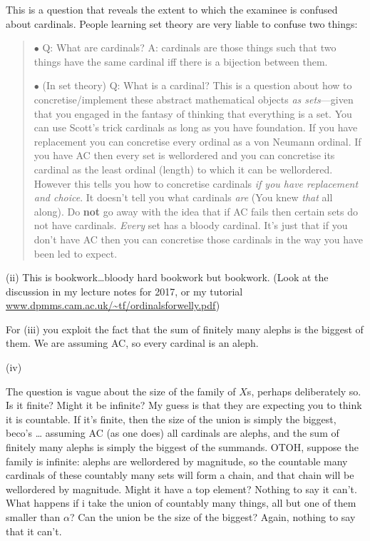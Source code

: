 \documentclass{book}
\begin{document}
This is a question that reveals the extent to which the examinee is
confused about cardinals.  People learning set theory are very liable
to confuse two things:
\begin{quote}
$\bullet$ Q: What are cardinals?  A: cardinals are those things such that
two things have the same cardinal iff there is a bijection between
them.

$\bullet$ (In set theory) Q: What is a cardinal?  This is a question
about how to concretise/implement these abstract mathematical objects
{\sl as sets}---given that you engaged in the fantasy of thinking that
everything is a set.  You can use Scott's trick cardinals as long as
you have foundation.  If you have replacement you can concretise every
ordinal as a von Neumann ordinal. If you have AC then every set is
wellordered and you can concretise its cardinal as the least ordinal
(length) to which it can be wellordered.  However this tells you how
to concretise cardinals {\sl if you have replacement and choice}.  It
doesn't tell you what cardinals {\sl are} (You knew {\sl that} all
along).  Do {\bf not} go away with the idea that if AC fails then
certain sets do not have cardinals.  {\sl Every} set has a bloody
cardinal.  It's just that if you don't have AC then you can concretise
those cardinals in the way you have been led to expect.
\end{quote}

\noindent (ii)  This is bookwork\ldots bloody hard bookwork but bookwork.
(Look at the discussion in my lecture notes for 2017, or my tutorial
\url{www.dpmms.cam.ac.uk/~tf/ordinalsforwelly.pdf})

\noindent For (iii) you exploit the fact that the sum of finitely many alephs is
the biggest of them.  We are assuming AC, so every cardinal is an
aleph.


\noindent(iv)

The question is vague about the size of the family of $X$s, perhaps
deliberately so.  Is it finite?  Might it be infinite?  My guess is
that they are expecting you to think it is countable.  If it's finite,
then the size of the union is simply the biggest, beco's \ldots
assuming AC (as one does) all cardinals are alephs, and the sum of
finitely many alephs is simply the biggest of the summands. OTOH,
suppose the family is infinite: alephs are wellordered by magnitude,
so the countable many cardinals of these countably many sets will form
a chain, and that chain will be wellordered by magnitude.  Might it
have a top element?  Nothing to say it can't.  What happens if i take
the union of countably many things, all but one of them smaller than
$\alpha$?  Can the union be the size of the biggest?  Again, nothing
to say that it can't.
\end{document}
